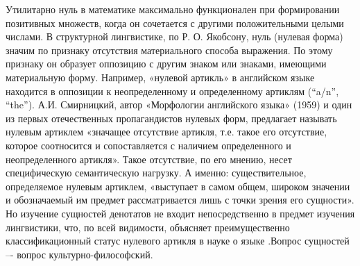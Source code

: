 Утилитарно нуль в математике максимально функционален при формировании позитивных множеств, когда он сочетается с другими положительными целыми числами. В структурной лингвистике, по Р. О. Якобсону, нуль (нулевая форма) значим по признаку отсутствия материального способа выражения.  По этому признаку он образует оппозицию с другим знаком или знаками, имеющими материальную форму. Например, «нулевой артикль» в английском языке находится в оппозиции к неопределенному и определенному артиклям (“a/n”, “the”).  А.И. Смирницкий,  автор «Морфологии английского языка» (1959) и один из первых отечественных пропагандистов нулевых форм, предлагает называть нулевым артиклем «значащее отсутствие артикля, т.е. такое его отсутствие, которое соотносится и сопоставляется с наличием определенного и неопределенного артикля»\autocite[][382]{smirnizki1959}. Такое отсутствие, по его мнению, несет специфическую семантическую нагрузку. А именно: существительное, определяемое нулевым артиклем, «выступает в самом общем, широком значении и обозначаемый им предмет рассматривается лишь с точки зрения его сущности»\autocite[][383]{smirnizki1959}. Но изучение сущностей денотатов не входит непосредственно в предмет изучения лингвистики, что, по всей видимости, объясняет преимущественно классификационный статус нулевого артикля в науке о языке \autocite{berezowski2009}.Вопрос сущностей –- вопрос культурно-философский.

